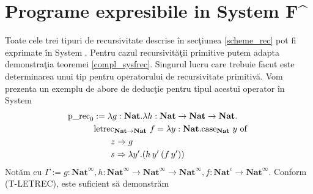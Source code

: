\section[Programe expresibile]{Programe expresibile in System F\^{}}
Toate cele trei tipuri de recursivitate descrise \^ in sec\c tiunea \ref{scheme_rec} pot fi exprimate \^ in System \fhat. Pentru cazul recursivit\u a\c tii primitive putem adapta demonstra\c tia teoremei \ref{compl_sysfrec}. Singurul lucru care trebuie facut este determinarea unui tip pentru operatorului de recursivitate primitiv\u a. Vom prezenta un exemplu de abore de deduc\c tie pentru tipul acestui operator \^ in System \fhat
\begin{align*}
\text{p\_rec}_0     &:= \lambda g:\textbf{Nat}. \lambda h:\textbf{Nat} \to \textbf{Nat}\to \textbf{Nat}.\\
                    & \text{letrec}_{\textbf{Nat}\to\textbf{Nat}}\ f =\lambda y : \textbf{Nat} . \text{case}_{\textbf{Nat}}\ y \text{ of } \\
                    & \qquad z \Rightarrow g \\
                    & \qquad s \Rightarrow \lambda y'. (h\app y'\app (f\app y'))
\end{align*}
Not\u am cu  $\Gamma := g:\textbf{Nat}^{\infty} , h:\textbf{Nat}^{\infty} \to \textbf{Nat}^{\infty}\to \textbf{Nat}^{\infty}, f : \textbf{Nat}^{\iota}\to \textbf{Nat}^{\infty}$. Conform {\scriptsize (T-LETREC)}, este suficient s\u a demonstr\u am
\begin{prooftree}



\end{prooftree}

